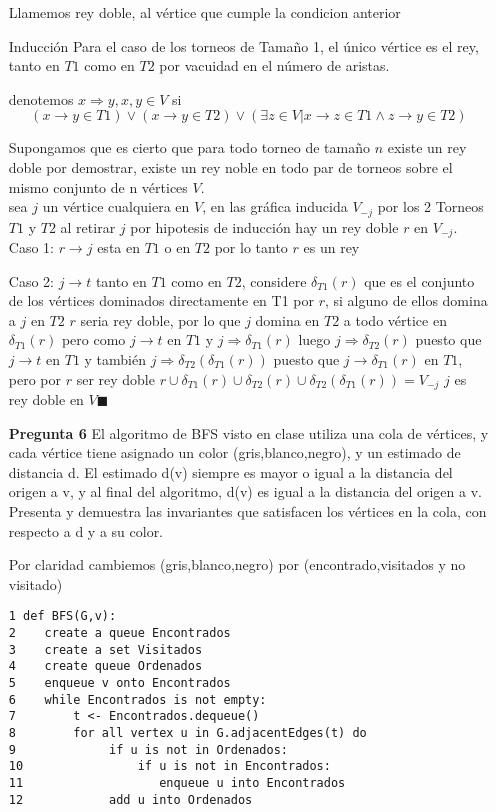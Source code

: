 \documentclass[12pt]{articlels
}
\begin{document}
\begin{itemize}
Llamemos rey doble, al vértice que cumple la condicion anterior\\

\item[Inducción] Para el caso de los torneos de Tamaño 1, el único vértice es el rey, tanto en $T1$ como en $T2$ por vacuidad en el número de aristas.

  denotemos $x \Rightarrow y , x,y \in V$ si $$(x \rightarrow y \in T1) \vee (x \rightarrow y \in T2) \vee (\exists z \in V | x \rightarrow z \in T1 \wedge z \rightarrow y \in T2)$$ 

  Supongamos que es cierto que para todo torneo de tamaño $n$ existe un rey doble
  por demostrar, existe un rey noble en todo par de torneos sobre el mismo conjunto de n vértices $V$.\\
  sea $j$ un vértice cualquiera en $V$, en las gráfica inducida $V_{-j}$ por los 2 Torneos $T1$ y $T2$ al retirar $j$ por hipotesis de inducción hay un rey doble $r$ en $V_{-j}$.\\
Caso 1: $r \rightarrow j $ esta en $T1$ o en $T2$  por lo tanto $r$ es un rey

Caso 2: $j \rightarrow t $ tanto en $T1$ como en $T2$, considere $\delta_{T1}(r)$ que 
es el conjunto de los vértices dominados directamente en T1 por $r$, si alguno de ellos
 domina a $j$ en $T2$ $r$ seria rey doble, por lo que $j$ domina en $T2$ a todo 
vértice en $\delta_{T1}(r)$ pero como $j \rightarrow t $ en $T1 $  y
 $ j \Rightarrow \delta_{T1}(r) $ luego $ j \Rightarrow \delta_{T2}(r) $ puesto que 
 $j \rightarrow t $ en $T1$ y también $ j \Rightarrow \delta_{T2}(\delta_{T1}(r))$ 
puesto que $j \rightarrow \delta_{T1}(r) $ en $T1$, pero por $r$ ser rey doble 
$r \cup \delta_{T1}(r) \cup \delta_{T2}(r) \cup \delta_{T2}(\delta_{T1}(r)) = V_{-j}$ $j$ es rey doble en $V \blacksquare$



\item[\bf{Pregunta 6}]El algoritmo de BFS visto en clase utiliza una cola de vértices, y cada vértice tiene asignado un color (gris,blanco,negro), y un estimado de distancia d. El estimado d(v) siempre es mayor o igual a la distancia del origen a v, y al final del algoritmo, d(v) es igual a la distancia del origen a v. Presenta y demuestra las invariantes que satisfacen los vértices en la cola, con respecto a d y a su color.

Por claridad cambiemos (gris,blanco,negro) por (encontrado,visitados y no visitado)
\begin{lstlisting}[frame=single] 
1 def BFS(G,v):
2    create a queue Encontrados
3    create a set Visitados
4    create queue Ordenados
5    enqueue v onto Encontrados
6    while Encontrados is not empty:
7        t <- Encontrados.dequeue()
8        for all vertex u in G.adjacentEdges(t) do
9             if u is not in Ordenados:
10                if u is not in Encontrados:
11                   enqueue u into Encontrados
12            add u into Ordenados
\end{lstlisting}


\end{itemize}
\end{document}
